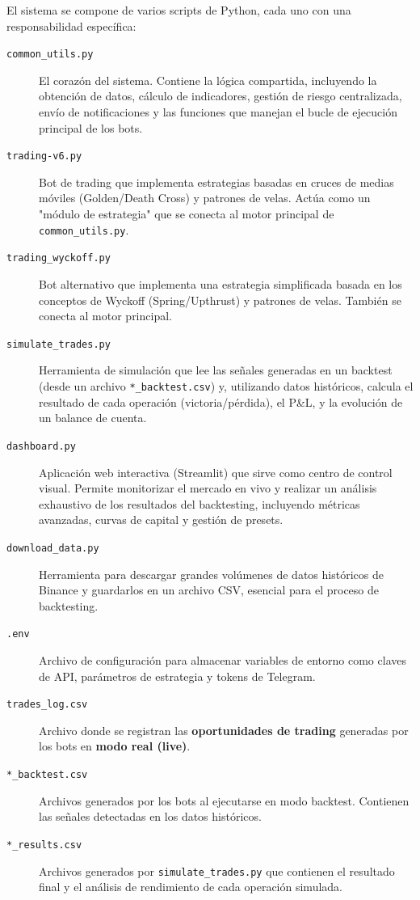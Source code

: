 \documentclass[12pt, a4paper]{article}
\begin{document}
El sistema se compone de varios scripts de Python, cada uno con una responsabilidad específica:

\begin{description}
    \item[\texttt{common\_utils.py}] El corazón del sistema. Contiene la lógica compartida, incluyendo la obtención de datos, cálculo de indicadores, gestión de riesgo centralizada, envío de notificaciones y las funciones que manejan el bucle de ejecución principal de los bots.
    
    \item[\texttt{trading-v6.py}] Bot de trading que implementa estrategias basadas en cruces de medias móviles (Golden/Death Cross) y patrones de velas. Actúa como un "módulo de estrategia" que se conecta al motor principal de \texttt{common\_utils.py}.
    
    \item[\texttt{trading\_wyckoff.py}] Bot alternativo que implementa una estrategia simplificada basada en los conceptos de Wyckoff (Spring/Upthrust) y patrones de velas. También se conecta al motor principal.
    
    \item[\texttt{simulate\_trades.py}] Herramienta de simulación que lee las señales generadas en un backtest (desde un archivo \texttt{*\_backtest.csv}) y, utilizando datos históricos, calcula el resultado de cada operación (victoria/pérdida), el P\&L, y la evolución de un balance de cuenta.
    
    \item[\texttt{dashboard.py}] Aplicación web interactiva (Streamlit) que sirve como centro de control visual. Permite monitorizar el mercado en vivo y realizar un análisis exhaustivo de los resultados del backtesting, incluyendo métricas avanzadas, curvas de capital y gestión de presets.
    
    \item[\texttt{download\_data.py}] Herramienta para descargar grandes volúmenes de datos históricos de Binance y guardarlos en un archivo CSV, esencial para el proceso de backtesting.
    
    \item[\texttt{.env}] Archivo de configuración para almacenar variables de entorno como claves de API, parámetros de estrategia y tokens de Telegram.
    
    \item[\texttt{trades\_log.csv}] Archivo donde se registran las \textbf{oportunidades de trading} generadas por los bots en \textbf{modo real (live)}.
    
    \item[\texttt{*\_backtest.csv}] Archivos generados por los bots al ejecutarse en modo backtest. Contienen las señales detectadas en los datos históricos.
    
    \item[\texttt{*\_results.csv}] Archivos generados por \texttt{simulate\_trades.py} que contienen el resultado final y el análisis de rendimiento de cada operación simulada.
\end{description}
\end{document}

